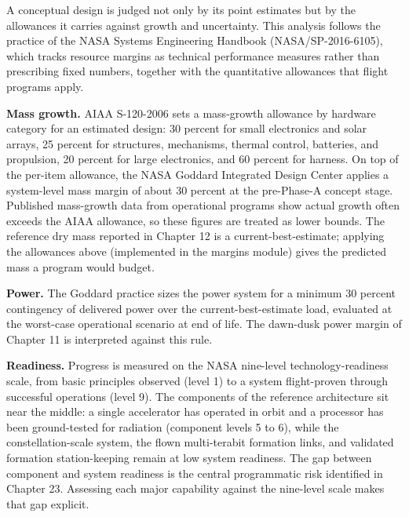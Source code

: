 \documentclass[
  11pt,
  openany,
  oneside]{book}
\begin{document}
A conceptual design is judged not only by its point estimates but by the
allowances it carries against growth and uncertainty. This analysis
follows the practice of the NASA Systems Engineering Handbook
(NASA/SP-2016-6105), which tracks resource margins as technical
performance measures rather than prescribing fixed numbers, together
with the quantitative allowances that flight programs apply.

\textbf{Mass growth.} AIAA S-120-2006 sets a mass-growth allowance by
hardware category for an estimated design: 30 percent for small
electronics and solar arrays, 25 percent for structures, mechanisms,
thermal control, batteries, and propulsion, 20 percent for large
electronics, and 60 percent for harness. On top of the per-item
allowance, the NASA Goddard Integrated Design Center applies a
system-level mass margin of about 30 percent at the pre-Phase-A concept
stage. Published mass-growth data from operational programs show actual
growth often exceeds the AIAA allowance, so these figures are treated as
lower bounds. The reference dry mass reported in Chapter 12 is a
current-best-estimate; applying the allowances above (implemented in the
margins module) gives the predicted mass a program would budget.

\textbf{Power.} The Goddard practice sizes the power system for a
minimum 30 percent contingency of delivered power over the
current-best-estimate load, evaluated at the worst-case operational
scenario at end of life. The dawn-dusk power margin of Chapter 11 is
interpreted against this rule.

\textbf{Readiness.} Progress is measured on the NASA nine-level
technology-readiness scale, from basic principles observed (level 1) to
a system flight-proven through successful operations (level 9). The
components of the reference architecture sit near the middle: a single
accelerator has operated in orbit and a processor has been ground-tested
for radiation (component levels 5 to 6), while the constellation-scale
system, the flown multi-terabit formation links, and validated formation
station-keeping remain at low system readiness. The gap between
component and system readiness is the central programmatic risk
identified in Chapter 23. Assessing each major capability against the
nine-level scale makes that gap explicit.
\end{document}
